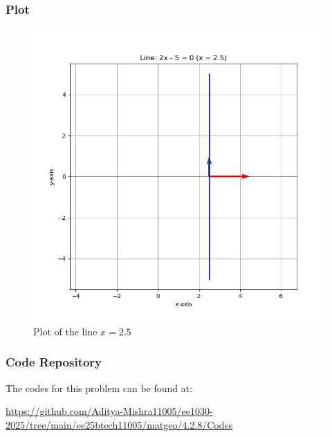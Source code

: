 \documentclass{beamer}
\begin{document}
\begin{frame}
\frametitle{Plot}
\begin{figure}[H]
    \centering
    \includegraphics[width=0.6\columnwidth]{Figs/Figure_1.png}
    \caption{Plot of the line $x = 2.5$}
    \label{fig:428}
\end{figure}
\end{frame}

\begin{frame}
\frametitle{Code Repository}
The codes for this problem can be found at:

\centering
\url{https://github.com/Aditya-Mishra11005/ee1030-2025/tree/main/ee25btech11005/matgeo/4.2.8/Codes}
\end{frame}
\end{document}

